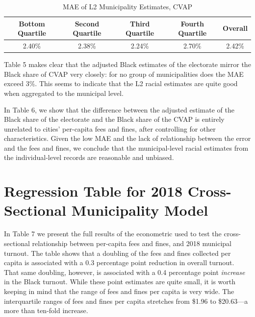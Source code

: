 \documentclass[
  12pt,
]{article}
\begin{document}
\begin{singlespace}
\begin{table}[H]

\caption{\label{tab:mae-chunck}\label{tab:mae} MAE of L2 Municipality Estimates, CVAP}
\centering
\begin{tabular}[t]{ccccc}
\toprule
Bottom Quartile & Second Quartile & Third Quartile & Fourth Quartile & Overall\\
\midrule
2.40\% & 2.38\% & 2.24\% & 2.70\% & 2.42\%\\
\bottomrule
\end{tabular}
\end{table}
\end{singlespace}

Table 5 makes clear that the adjusted Black estimates of the electorate mirror the Black share of CVAP very closely: for no group of municipalities does the MAE exceed 3\%. This seems to indicate that the L2 racial estimates are quite good when aggregated to the municipal level.

In Table 6, we show that the difference between the adjusted estimate of the Black share of the electorate and the Black share of the CVAP is entirely unrelated to cities' per-capita fees and fines, after controlling for other characteristics. Given the low MAE and the lack of relationship between the error and the fees and fines, we conclude that the municipal-level racial estimates from the individual-level records are reasonable and unbiased.

\begin{singlespace}

\end{singlespace}

\hypertarget{regression-table-for-2018-cross-sectional-municipality-model}{%
\section*{Regression Table for 2018 Cross-Sectional Municipality Model}\label{regression-table-for-2018-cross-sectional-municipality-model}}

In Table 7 we present the full results of the econometric used to test the cross-sectional relationship between per-capita fees and fines, and 2018 municipal turnout. The table shows that a doubling of the fees and fines collected per capita is associated with a 0.3 percentage point reduction in overall turnout. That same doubling, however, is associated with a 0.4 percentage point \emph{increase} in the Black turnout. While these point estimates are quite small, it is worth keeping in mind that the range of fees and fines per capita is very wide. The interquartile ranges of fees and fines per capita stretches from \$1.96 to \$20.63---a more than ten-fold increase.
\end{document}
